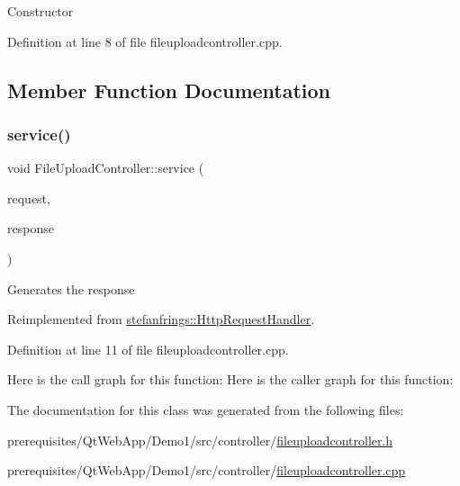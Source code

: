 Constructor 

Definition at line 8 of file fileuploadcontroller.\+cpp.



\subsection{Member Function Documentation}
\mbox{\label{class_file_upload_controller_adfa8811a91e6f1ddf7f28f4d98cb1679}} 
\subsubsection{\texorpdfstring{service()}{service()}}
{\footnotesize\ttfamily void File\+Upload\+Controller\+::service (\begin{DoxyParamCaption}\item[{\mbox{\hyperlink{classstefanfrings_1_1_http_request}{Http\+Request}} \&}]{request,  }\item[{\mbox{\hyperlink{classstefanfrings_1_1_http_response}{Http\+Response}} \&}]{response }\end{DoxyParamCaption})\hspace{0.3cm}{\ttfamily [virtual]}}

Generates the response 

Reimplemented from \mbox{\hyperlink{classstefanfrings_1_1_http_request_handler_a0a7210907152c46b8b5a47feb64cf6bd}{stefanfrings\+::\+Http\+Request\+Handler}}.



Definition at line 11 of file fileuploadcontroller.\+cpp.

Here is the call graph for this function\+:
Here is the caller graph for this function\+:


The documentation for this class was generated from the following files\+:\begin{DoxyCompactItemize}
\item 
prerequisites/\+Qt\+Web\+App/\+Demo1/src/controller/\mbox{\hyperlink{fileuploadcontroller_8h}{fileuploadcontroller.\+h}}\item 
prerequisites/\+Qt\+Web\+App/\+Demo1/src/controller/\mbox{\hyperlink{fileuploadcontroller_8cpp}{fileuploadcontroller.\+cpp}}\end{DoxyCompactItemize}
